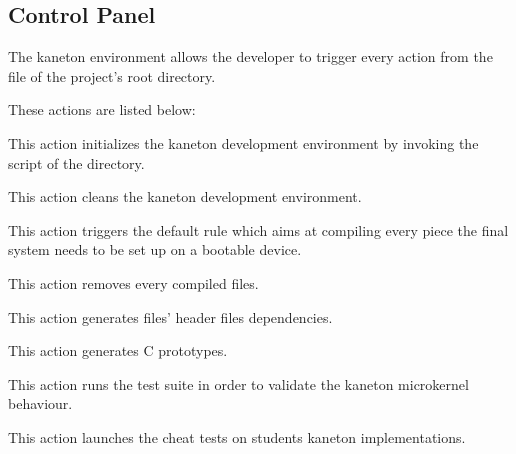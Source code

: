 %
%
%
%
%
%

%
%

\subsection{Control Panel}
\label{section:control panel}

The kaneton environment allows the developer to trigger every action from
the  file of the project's root directory.

These actions are listed below:

        {
	  This action initializes the kaneton development environment by
	  invoking the  script of the 
	  directory.
	}

	{
	  This action cleans the kaneton development environment.
	}

	{
	  This action triggers the default rule which aims at compiling every
	  piece the final system needs to be set up on a bootable device.

	  \-


	}

	{
	  This action removes every compiled files.
	}

	{
	  This action generates  files'  header
	  files dependencies.
	}

	{
	  This action generates C prototypes.
	}

	{
	  This action runs the test suite in order to validate the kaneton
	  microkernel behaviour.
	}

	{
	  This action launches the cheat tests on students kaneton
	  implementations.

	  \-


	  \-

	}

